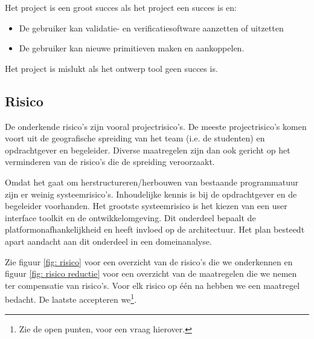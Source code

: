 Het project is een groot succes als het project een succes is en:

\begin{itemize}
 \item De gebruiker kan validatie- en verificatiesoftware aanzetten of uitzetten
 \item De gebruiker kan nieuwe primitieven maken en aankoppelen.
\end{itemize}

Het project is mislukt als het ontwerp tool geen succes is.

\subsection{Risico}

De onderkende risico's zijn vooral projectrisico's. De meeste projectrisico's komen voort uit de
geografische spreiding van het team (i.e. de studenten) en opdrachtgever
en begeleider. Diverse maatregelen zijn dan ook gericht op het verminderen
van de risico's die de spreiding veroorzaakt.


Omdat het gaat om herstructureren/herbouwen van bestaande programmatuur zijn er weinig systeemrisico's.
Inhoudelijke kennis is bij de opdrachtgever en de begeleider voorhanden. Het grootste systeemrisico is het kiezen
van een user interface toolkit en de ontwikkelomgeving. Dit onderdeel bepaalt de platformonafhankelijkheid
en heeft invloed op de architectuur. Het plan besteedt apart aandacht aan dit onderdeel in een domeinanalyse.

Zie figuur \ref{fig: risico} voor een overzicht van de risico's die we onderkennen en figuur \ref{fig: risico reductie} voor
een overzicht van de maatregelen die we nemen ter compensatie van risico's. Voor elk risico op \'e\'en na hebben we een
maatregel bedacht. De laatste accepteren we\footnote{Zie de open punten, voor een vraag hierover.}.

